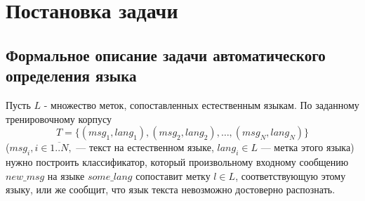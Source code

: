 \documentclass[a4paper, 14pt]{article}
\begin{document}
\pagebreak	        
	        
\section{Постановка задачи}
		\subsection{Формальное описание задачи автоматического определения языка}
		Пусть $L$ - множество меток, сопоставленных естественным языкам.
		По заданному тренировочному корпусу $$ T = \{(msg_{1}, lang_{1}), (msg_{2}, lang_{2}), \ldots, (msg_{N}, lang_{N}) \} $$
		($msg_{i}, i \in \overline{1..N},$ --- текст на естественном языке, $lang_{i} \in L$ --- метка этого языка) нужно построить классификатор,
		который произвольному входному сообщению $new\_msg$ на языке $some\_lang$ сопоставит метку $l \in L$, соответствующую этому языку,
		 или же сообщит, что язык текста невозможно достоверно распознать.
\end{document}
